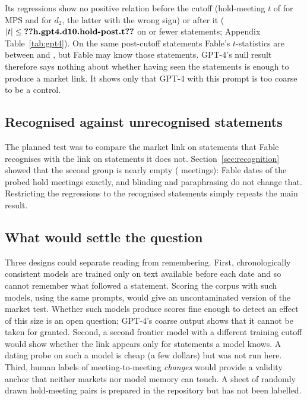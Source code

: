 Its regressions show no positive relation before the cutoff (hold-meeting $t$ of 
for MPS and  for $d_2$, the latter with the wrong sign) or after it
($|t|\le\R{h.gpt4.d10.hold-post.t}$ on  or fewer statements; Appendix
Table~\ref{tab:gpt4}). On the same post-cutoff statements Fable's $t$-statistics are between
 and , but Fable may know those statements. GPT-4's
null result therefore says nothing about whether having seen the statements is enough to produce a
market link. It shows only that GPT-4 with this prompt is too coarse to be a control.

\subsection{Recognised against unrecognised statements}

The planned test was to compare the market link on statements that Fable recognises with the link on
statements it does not. Section~\ref{sec:recognition} showed that the second group is nearly empty
( meetings): Fable dates
 of the  probed hold meetings exactly, and blinding and paraphrasing do
not change that. Restricting the regressions to the recognised statements simply repeats the main result.

\subsection{What would settle the question}

Three designs could separate reading from remembering. First, chronologically consistent models
\citep{he2025,drinkall2024} are trained only on text available before each date and so cannot remember
what followed a statement. Scoring the corpus with such models, using the same prompts, would give an
uncontaminated version of the market test. Whether such models produce scores fine enough to detect an
effect of this size is an open question; GPT-4's coarse output shows that it cannot be taken for granted.
Second, a second frontier model with a different training cutoff would show whether the link appears only
for statements a model knows. A dating probe on such a model is cheap (a few dollars) but was not run here.
Third, human labels of meeting-to-meeting \emph{changes} would provide a validity anchor that neither
markets nor model memory can touch. A sheet of  randomly drawn hold-meeting pairs is
prepared in the repository but has not been labelled.
